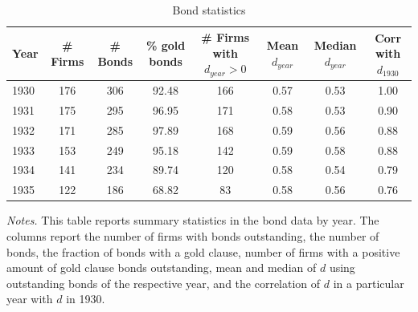 \begin{table}[p]
\centering
\caption{\\ Bond statistics}
\scriptsize
\renewcommand{\arraystretch}{1.2}
\label{tabapp:bonds}
\begin{tabular}{lccccccc}
\toprule
Year & \# Firms & \# Bonds & \% gold bonds & \# Firms with $d_{year} > 0$ & Mean $d_{year}$ & Median $d_{year}$ & Corr with $d_{1930}$\\
\midrule
1930 & 176 & 306 & 92.48 & 166 & 0.57 & 0.53 & 1.00\\
1931 & 175 & 295 & 96.95 & 171 & 0.58 & 0.53 & 0.90\\
1932 & 171 & 285 & 97.89 & 168 & 0.59 & 0.56 & 0.88\\
1933 & 153 & 249 & 95.18 & 142 & 0.59 & 0.58 & 0.88\\
1934 & 141 & 234 & 89.74 & 120 & 0.58 & 0.54 & 0.79\\
1935 & 122 & 186 & 68.82 & 83  & 0.58 & 0.56 & 0.76\\
\bottomrule
\end{tabular}

\vspace*{3mm} \justifying \noindent
\scriptsize{\textit{Notes.} This table reports summary statistics in the bond data by year. The columns report the number of firms with bonds outstanding, the number of bonds, the fraction of bonds with a gold clause, number of firms with a positive amount of gold clause bonds outstanding, mean and median of $d$ using outstanding bonds of the respective year, and the correlation of $d$ in a particular year with $d$ in 1930.}
\end{table}